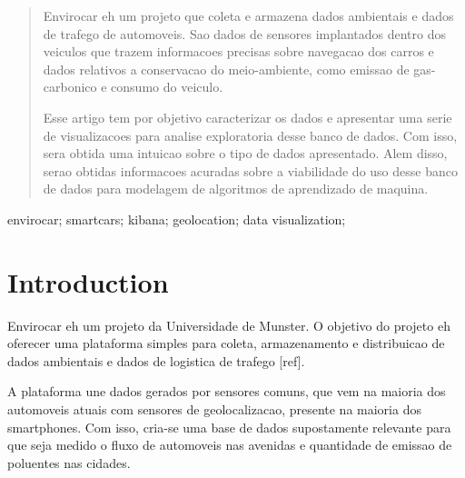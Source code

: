 \documentclass[10pt, conference]{IEEEtran}
\begin{document}
\maketitle


\begin{abstract}
Envirocar eh um projeto que coleta e armazena dados ambientais e dados de trafego
de automoveis. 
Sao dados de sensores implantados dentro dos veiculos que trazem informacoes
precisas sobre navegacao dos carros e dados relativos a conservacao do meio-ambiente, 
como emissao de gas-carbonico e consumo do veiculo. 

Esse artigo tem por objetivo caracterizar os dados e apresentar uma serie de 
visualizacoes para analise exploratoria desse banco de dados. Com isso, sera
obtida uma intuicao sobre o tipo de dados apresentado. Alem disso, serao obtidas
informacoes acuradas sobre a viabilidade do uso desse banco de dados para modelagem
de algoritmos de aprendizado de maquina.

%
\end{abstract}

\begin{IEEEkeywords}
envirocar; smartcars; kibana; geolocation; data visualization;

\end{IEEEkeywords}


\IEEEpeerreviewmaketitle





\section{Introduction}
Envirocar eh um projeto da Universidade de Munster. O objetivo 
do projeto eh oferecer uma plataforma simples para coleta, 
armazenamento e distribuicao de dados ambientais e dados de logistica
de trafego [ref]. 

A plataforma une dados gerados por sensores comuns,
que vem na maioria dos automoveis atuais com sensores de 
geolocalizacao, presente na maioria dos smartphones. Com isso,
cria-se uma base de dados supostamente relevante para que seja medido o fluxo de automoveis
nas avenidas e quantidade de emissao de poluentes nas cidades. 
\end{document}
